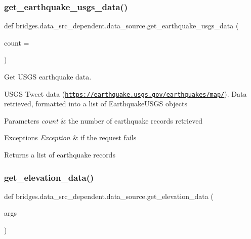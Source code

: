 \subsubsection{\texorpdfstring{get\+\_\+earthquake\+\_\+usgs\+\_\+data()}{get\_earthquake\_usgs\_data()}}
{\footnotesize\ttfamily def bridges.\+data\+\_\+src\+\_\+dependent.\+data\+\_\+source.\+get\+\_\+earthquake\+\_\+usgs\+\_\+data (\begin{DoxyParamCaption}\item[{}]{count = {} }\end{DoxyParamCaption})}



Get U\+S\+GS earthquake data. 

U\+S\+GS Tweet data (\href{https://earthquake.usgs.gov/earthquakes/map/}{\tt https\+://earthquake.\+usgs.\+gov/earthquakes/map/}). Data retrieved, formatted into a list of Earthquake\+U\+S\+GS objects


\begin{DoxyParams}{Parameters}
{\em count} & the number of earthquake records retrieved\\
\hline
\end{DoxyParams}

\begin{DoxyExceptions}{Exceptions}
{\em Exception} & if the request fails\\
\hline
\end{DoxyExceptions}
\begin{DoxyReturn}{Returns}
a list of earthquake records 
\end{DoxyReturn}
\mbox{\label{namespacebridges_1_1data__src__dependent_1_1data__source_a5193a0d8e1507b1cedb5de65f1d702bd}} 
\subsubsection{\texorpdfstring{get\+\_\+elevation\+\_\+data()}{get\_elevation\_data()}}
{\footnotesize\ttfamily def bridges.\+data\+\_\+src\+\_\+dependent.\+data\+\_\+source.\+get\+\_\+elevation\+\_\+data (\begin{DoxyParamCaption}\item[{}]{args }\end{DoxyParamCaption})}


